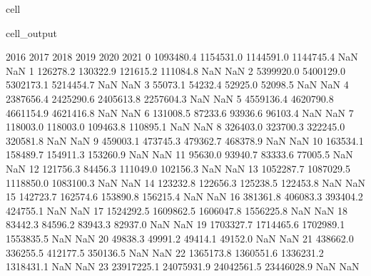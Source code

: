\documentclass[letterpaper,10pt,english]{jupyterBook}
\begin{document}
\begin{sphinxuseclass}{cell}
\begin{sphinxVerbatimOutput}
\begin{sphinxuseclass}{cell_output}
\begin{sphinxVerbatim}[commandchars=\\\{\}]
          2016        2017        2018        2019  2020  2021  
0    1093480.4   1154531.0   1144591.0   1144745.4   NaN   NaN  
1     126278.2    130322.9    121615.2    111084.8   NaN   NaN  
2    5399920.0   5400129.0   5302173.1   5214454.7   NaN   NaN  
3      55073.1     54232.4     52925.0     52098.5   NaN   NaN  
4    2387656.4   2425290.6   2405613.8   2257604.3   NaN   NaN  
5    4559136.4   4620790.8   4661154.9   4621416.8   NaN   NaN  
6     131008.5     87233.6     93936.6     96103.4   NaN   NaN  
7     118003.0    118003.0    109463.8    110895.1   NaN   NaN  
8     326403.0    323700.3    322245.0    320581.8   NaN   NaN  
9     459003.1    473745.3    479362.7    468378.9   NaN   NaN  
10    163534.1    158489.7    154911.3    153260.9   NaN   NaN  
11     95630.0     93940.7     83333.6     77005.5   NaN   NaN  
12    121756.3     84456.3    111049.0    102156.3   NaN   NaN  
13   1052287.7   1087029.5   1118850.0   1083100.3   NaN   NaN  
14    123232.8    122656.3    125238.5    122453.8   NaN   NaN  
15    142723.7    162574.6    153890.8    156215.4   NaN   NaN  
16    381361.8    406083.3    393404.2    424755.1   NaN   NaN  
17   1524292.5   1609862.5   1606047.8   1556225.8   NaN   NaN  
18     83442.3     84596.2     83943.3     82937.0   NaN   NaN  
19   1703327.7   1714465.6   1702989.1   1553835.5   NaN   NaN  
20     49838.3     49991.2     49414.1     49152.0   NaN   NaN  
21    438662.0    336255.5    412177.5    350136.5   NaN   NaN  
22   1365173.8   1360551.6   1336231.2   1318431.1   NaN   NaN  
23  23917225.1  24075931.9  24042561.5  23446028.9   NaN   NaN  
\end{sphinxVerbatim}

\end{sphinxuseclass}\end{sphinxVerbatimOutput}

\end{sphinxuseclass}
\end{document}

